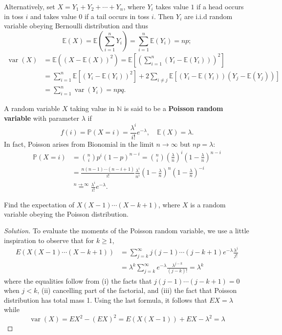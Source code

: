 \documentclass[11pt,singlecolumn, openany, citestyle=authoryear]{elegantbook}
\begin{document}
\begin{CJK}{UTF8}{gbsn}
\begin{example}[(Binomial($n,p$))]
    Alternatively, set $X=Y_1+Y_2+\cdots+Y_n$, where $Y_i$ takes value $1$ if 
    a head occurs in toss $i$ and takes value $0$ if a tail occurs in toss $i$.
    Then $Y_i$ are i.i.d random variable obeying Bernoulli distribution and thus 
    $$
    \mathbb{E}(X) = \mathbb{E}(\sum_{i=1}^n Y_i) = \sum_{i=1}^n \mathbb{E}(Y_i) = np;
    $$ 
    \begin{align*}
    \operatorname{var}(X)&= \mathbb{E}((X-\mathbb{E}(X))^2) = 
        \mathbb{E}\left[
            \left(
                \sum_{i=1}^n (Y_i-\mathbb{E}(Y_i))
            \right)^2
        \right]\\
        &= \sum_{i=1}^n \mathbb{E}[(Y_i-\mathbb{E}(Y_i))^2]
        +2\sum_{i\neq j}\mathbb{E}[(Y_i-\mathbb{E}(Y_i))(Y_j-\mathbb{E}(Y_j))]\\
        &= \sum_{i=1}^n \operatorname{var}(Y_i) = npq.
    \end{align*}
\end{example}

\begin{example}
    A random variable $X$ taking value in $\mathbb{N}$ is said to be a \textbf{Poisson
    random variable} with parameter $\lambda$ if 
    $$
    f(i)=\mathbb{P}(X=i)=\frac{\lambda^i}{i!}e^{-\lambda},\quad 
    \mathbb{E}(X)=\lambda.
    $$
    In fact, Poisson arises from Bionomial in the limit $n \to \infty$ but $np=\lambda$:
    \begin{align*}
        \mathbb{P}(X=i)&=\binom{n}{i}p^i(1-p)^{n-i}= \binom{n}{i}
        \left(\frac{\lambda}{n}\right)^i \left(1-\frac{\lambda}{n}\right)^{n-i}\\
        &=\frac{n(n-1)\cdots(n-i+1)}{i!}\frac{\lambda^i}{n^i}\left(1-\frac{\lambda}{n}\right)^{n}
        \left(1-\frac{\lambda}{n}\right)^{-i}\\
        &\overset{n \to \infty}{=}\frac{\lambda^i}{i!}e^{-\lambda}.
    \end{align*}
\end{example}

\begin{exercise}
    Find the expectation of $X(X-1)\cdots(X-k+1)$, where $X$ is a random variable obeying the 
    Poisson distribution.
\end{exercise}
\begin{proof}[Solution]
    To evaluate the moments of the Poisson random variable, 
    we use a little inspiration to observe that for $k \geq 1$,
$$
\begin{aligned}
E(X(X-1) \cdots(X-k+1)) & =\sum_{j=k}^{\infty} j(j-1) \cdots(j-k+1) e^{-\lambda} \frac{\lambda^j}{j !} \\
& =\lambda^k \sum_{j=k}^{\infty} e^{-\lambda} \frac{\lambda^{j-k}}{(j-k) !}=\lambda^k
\end{aligned}
$$
where the equalities follow from (i) the facts that $j(j-1) \cdots(j-k+1)=0$ when $j<k$, (ii) cancelling part of the factorial, and (iii) the fact that Poisson distribution has total mass 1. Using the last formula, it follows that $E X=\lambda$ while
$$
\operatorname{var}(X)=E X^2-(E X)^2=E(X(X-1))+E X-\lambda^2=\lambda
$$
\end{proof}


\end{CJK}
\end{document}
